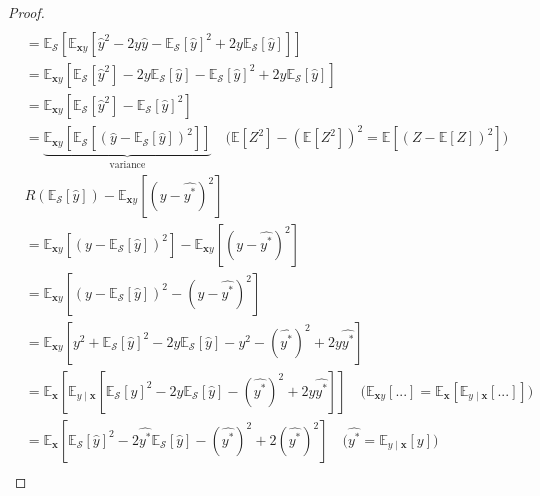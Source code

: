 \documentclass{article}
\begin{document}
\begin{center}
\begin{proof}
\begin{align*}
            \\
            &= \mathbb{E}_{\mathcal{S}}\left[\mathbb{E}_{\mathbf{x}y}\left[\hat{y}^2 - 2y\hat{y} - \mathbb{E}_{\mathcal{S}}[\hat{y}]^2 + 2y\mathbb{E}_{\mathcal{S}}[\hat{y}]\right]\right]
            \\
            &= \mathbb{E}_{\mathbf{x}y}\left[\mathbb{E}_{\mathcal{S}}[\hat{y}^2] - 2y\mathbb{E}_{\mathcal{S}}[\hat{y}] - \mathbb{E}_{\mathcal{S}}[\hat{y}]^2 + 2y\mathbb{E}_{\mathcal{S}}[\hat{y}]\right]
            \\
            &= \mathbb{E}_{\mathbf{x}y}\left[\mathbb{E}_{\mathcal{S}}[\hat{y}^2] - \mathbb{E}_{\mathcal{S}}[\hat{y}]^2\right]
            \\
            &= \underbrace{\mathbb{E}_{\mathbf{x}y}\left[\mathbb{E}_{\mathcal{S}}\left[(\hat{y} - \mathbb{E}_{\mathcal{S}}[\hat{y}])^2\right]\right]}_{\text{variance}} \quad \text{(}\mathbb{E}\left[Z^2\right] - (\mathbb{E}\left[Z^2\right])^2 = \mathbb{E}\left[(Z - \mathbb{E}\left[Z\right])^2\right]\text{)}
            \\
            &R(\mathbb{E}_{\mathcal{S}}\left[\hat{y}\right]) - \mathbb{E}_{\mathbf{x}y}\left[(y - \hat{y^*})^2\right]
            \\
            &=\mathbb{E}_{\mathbf{x}y}\left[(y - \mathbb{E}_{\mathcal{S}}[\hat{y}])^2\right] - \mathbb{E}_{\mathbf{x}y}\left[(y - \hat{y^*})^2\right]
            \\
            &= \mathbb{E}_{\mathbf{x}y}\left[(y - \mathbb{E}_{\mathcal{S}}[\hat{y}])^2 - (y - \hat{y^*})^2\right]
            \\
            &= \mathbb{E}_{\mathbf{x}y}\left[y^2 + \mathbb{E}_{\mathcal{S}}[\hat{y}]^2 - 2y\mathbb{E}_{\mathcal{S}}[\hat{y}] - y^2 - (\hat{y^*})^2 + 2y\hat{y^*}\right]
            \\
            &= \mathbb{E}_{\mathbf{x}}\left[\mathbb{E}_{y \mid \mathbf{x}}\left[\mathbb{E}_{\mathcal{S}}[\hat{y}]^2 - 2y\mathbb{E}_{\mathcal{S}}[\hat{y}] - (\hat{y^*})^2 + 2y\hat{y^*}\right]\right] \quad \text{(}\mathbb{E}_{\mathbf{x}y}\left[...\right] = \mathbb{E}_{\mathbf{x}}\left[\mathbb{E}_{y \mid \mathbf{x}}\left[...\right]\right]\text{)}
            \\
            &= \mathbb{E}_{\mathbf{x}}\left[\mathbb{E}_{\mathcal{S}}[\hat{y}]^2 - 2\hat{y^*}\mathbb{E}_{\mathcal{S}}[\hat{y}] - (\hat{y^*})^2 + 2(\hat{y^*})^2\right] \quad \text{(}\hat{y^*} = \mathbb{E}_{y \mid \mathbf{x}}\left[y\right]\text{)}
            \\

\end{align*}
\end{proof}
\end{center}
\end{document}
